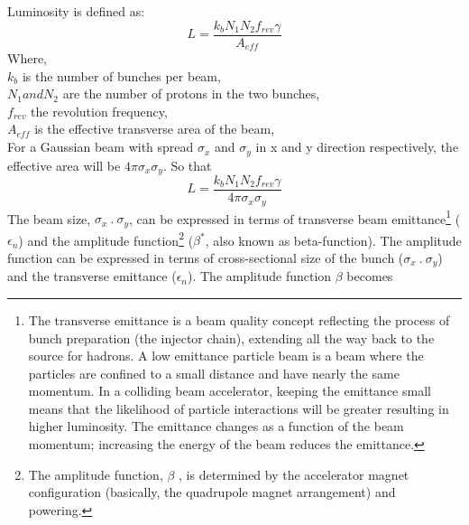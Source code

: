 Luminosity is defined as:
\begin{equation}
    L = \frac{k_bN_1N_2f_{rev}\gamma}{A_{eff}}
\end{equation}
Where,\\
\hspace{2 cm}$k_b$ is the number of bunches per beam,\\
\hspace{2 cm}$N_1 and N_2$ are the number of protons in the two bunches,\\
\hspace{2 cm}$f_{rev}$ the revolution frequency,\\
\hspace{2 cm}$A_{eff}$ is the effective transverse area of the beam,\\
For a Gaussian beam with spread $\sigma_x$ and $\sigma_y$ in x and y direction respectively, the effective area will be $4\pi \sigma_x \sigma_y$. So that
\begin{equation}\label{eq:luminosity}
    L = \frac{k_bN_1N_2f_{rev}\gamma}{4 \pi \sigma_x \sigma_y}
\end{equation}
The beam size, $\sigma_x~.~\sigma_y$, can be expressed in terms of transverse beam emittance\footnote{The transverse emittance is a beam quality concept reflecting the process of bunch preparation (the injector chain), extending all the way back to the source for hadrons. A low emittance particle beam is a beam where the particles are confined to a small distance and have nearly the same momentum. In a colliding beam accelerator, keeping the emittance small means that the likelihood of particle interactions will be greater resulting in higher luminosity. The emittance changes as a function of the beam momentum; increasing the energy of the beam reduces the emittance.} ($\epsilon_n$) and the amplitude function\footnote{The amplitude function, $\beta$ , is determined by the accelerator magnet configuration (basically, the quadrupole magnet arrangement) and powering. } ($\beta^*$, also known as beta-function). The amplitude function can be expressed in terms of cross-sectional size of the bunch ($\sigma_x~.~\sigma_y$) and  the transverse emittance ($\epsilon_n$). The amplitude function $\beta$  becomes 
